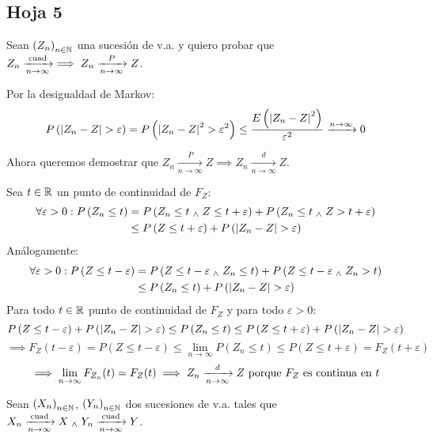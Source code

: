 \subsection{Hoja 5}

 Sean $\left(Z_n\right)_{n\in\mathbb{N}}$ una sucesión de v.a. y quiero probar que $Z_n \xrightarrow[n\to\infty]{\text{cuad}} \implies Z_n \xrightarrow[n\to\infty]{P} Z$.
\begin{dem} Por la desigualdad de Markov:
	\[P\left(\left|Z_n - Z\right| > \varepsilon\right) = P\left(\left|Z_n - Z\right|^2 > \varepsilon^2\right) \leq \frac{E\left(\left|Z_n - Z\right|^2\right)}{\varepsilon^2} \xrightarrow{n\to\infty} 0\]
\end{dem}
Ahora queremos demostrar que $Z_n \xrightarrow[n\to\infty]{P} Z \implies Z_n \xrightarrow[n\to\infty]{d} Z$.
\begin{dem} Sea $t\in\mathbb{R}$ un punto de continuidad de $F_Z$:
	\[\begin{aligned}
			\forall \varepsilon > 0 : P\left(Z_n \leq t\right) & = P\left(Z_n \leq t \; _{\wedge} \; Z \leq t+\varepsilon\right) + P\left(Z_n \leq t \; _{\wedge} \; Z > t+\varepsilon\right) \\
			                                                   & \leq P\left(Z \leq t+\varepsilon\right) + P\left(\left|Z_n - Z\right| > \varepsilon\right)
		\end{aligned}\]
	Análogamente:
	\[\begin{aligned}
			\forall \varepsilon > 0 : P\left(Z \leq t -\varepsilon\right) & = P\left(Z \leq t -\varepsilon \; _{\wedge} \; Z_n \leq t\right) + P\left(Z \leq t -\varepsilon \; _{\wedge} \; Z_n > t\right) \\
			                                                              & \leq P\left(Z_n \leq t\right) + P\left(\left|Z_n - Z\right| > \varepsilon\right)
		\end{aligned}\]
	Para todo $t\in\mathbb{R}$ punto de continuidad de $F_Z$ y para todo $\varepsilon > 0$:
	\[P\left(Z \leq t - \varepsilon\right) + P\left(\left|Z_n - Z\right| > \varepsilon\right) \leq P\left(Z_n \leq t\right) \leq P\left(Z \leq t + \varepsilon\right) + P\left(\left|Z_n - Z\right| > \varepsilon\right)\]
	\[\implies F_Z(t-\varepsilon) = P\left(Z \leq t - \varepsilon\right) \leq \lim_{n\to\infty} P\left(Z_n \leq t\right) \leq P\left(Z \leq t + \varepsilon\right) = F_Z(t+\varepsilon)\]
	\[\implies \lim_{n\to\infty} F_{Z_n}(t) = F_Z(t) \implies Z_n \xrightarrow[n\to\infty]{d} Z\text{ porque } F_Z \text{ es continua en } t\]
\end{dem}

 Sean $\left(X_n\right)_{n\in\mathbb{N}}$, $\left(Y_n\right)_{n\in\mathbb{N}}$ dos sucesiones de v.a. tales que $X_n \xrightarrow[n\to\infty]{\text{cuad}} X \; _{\wedge} \; Y_n \xrightarrow[n\to\infty]{\text{cuad}} Y$.

